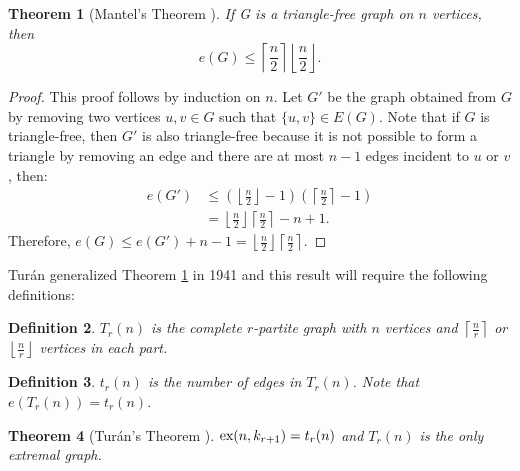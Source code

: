 \documentclass[12pt,twoside,a4paper,bibliography=totocnumbered]{book}
\numberwithin{equation}{section}
\newtheorem{theorem}             {Theorem}[section]
\newtheorem{definition}	[theorem] {Definition}
\theoremstyle{remark}
\def\ex{\mathop{\text{\rm ex}}\nolimits}
\begin{document}
\begin{theorem}[{Mantel's Theorem \cite{Ma07}}]\label{the:mantel}
If G is a triangle-free graph on $n$ vertices, then 
$$e(G) \leq \left\lceil \frac{n}{2} \right\rceil \left\lfloor \frac{n}{2} \right\rfloor .$$
\end{theorem}
\begin{proof}
This proof follows by induction on $n$. Let $G'$ be the graph obtained from $G$ by removing two vertices $u,v \in G$ such that $\{u,v\}\in E(G)$. Note that if $G$ is triangle-free, then $G'$ is also triangle-free because it is not possible to form a triangle by removing an edge and there are at most $n-1$ edges incident to $u$ or $v$, then:
\begin{align*}
e(G') &\leq \left(\left\lfloor \frac{n}{2} \right\rfloor -1\right)\left(\left\lceil \frac{n}{2} \right\rceil -1\right) \\
&= \left\lfloor \frac{n}{2} \right\rfloor \left\lceil \frac{n}{2} \right\rceil - n +1.
\end{align*}
Therefore, $e(G) \leq e(G') + n-1 = \left\lfloor \frac{n}{2} \right\rfloor \left\lceil \frac{n}{2} \right\rceil$. 
\end{proof}

Turán generalized Theorem \ref{the:mantel} in 1941 and this result will require the following definitions: 
\begin{definition}$T_r(n)$ is the complete $r$-partite graph with $n$ vertices and $\left\lceil \frac{n}{r} \right\rceil$ or $\left\lfloor \frac{n}{r} \right\rfloor$ vertices in each part.
\end{definition}

\begin{definition}
$t_r(n)$ is the number of edges in $T_r(n)$. Note that $e(T_r(n)) = t_r(n)$.
\end{definition}

\begin{theorem}[{Turán's Theorem \cite{Tu41}}] \label{theorem:turan1941}%
 $\ex(n, k_{r+1}) = t_r(n)$ and $T_r(n)$ is the only extremal graph.
\end{theorem}
\end{document}

